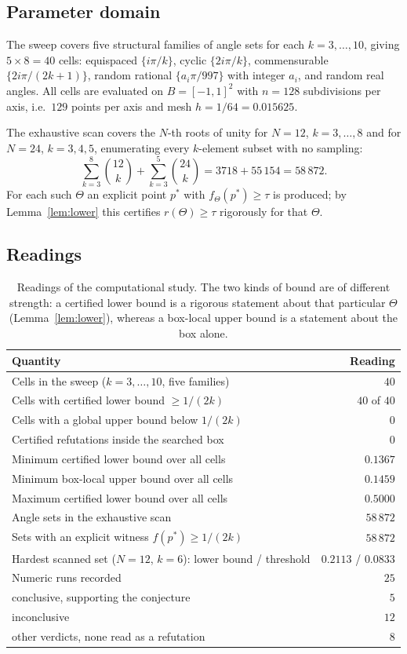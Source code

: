 \documentclass[11pt]{article}
\theoremstyle{plain}
\theoremstyle{definition}
\theoremstyle{remark}
\begin{document}
\subsection{Parameter domain}

The sweep covers five structural families of angle sets for each $k=3,\dots,10$, giving $5\times8=40$
cells: equispaced $\{i\pi/k\}$, cyclic $\{2i\pi/k\}$, commensurable $\{2i\pi/(2k+1)\}$, random rational
$\{a_i\pi/997\}$ with integer $a_i$, and random real angles. All cells are evaluated on $B=[-1,1]^2$
with $n=128$ subdivisions per axis, i.e.\ $129$ points per axis and mesh $h=1/64=0.015625$.

The exhaustive scan covers the $N$-th roots of unity for $N=12$, $k=3,\dots,8$ and for $N=24$,
$k=3,4,5$, enumerating every $k$-element subset with no sampling:
\[
\sum_{k=3}^{8}\binom{12}{k}+\sum_{k=3}^{5}\binom{24}{k}=3718+55\,154=58\,872 .
\]
For each such $\Theta$ an explicit point $p^{*}$ with $f_\Theta(p^{*})\ge\tau$ is produced; by
Lemma~\ref{lem:lower} this certifies $r(\Theta)\ge\tau$ rigorously for that $\Theta$.

\subsection{Readings}

\begin{table}[htbp]
\centering
\caption{Readings of the computational study. The two kinds of bound are of different strength: a
certified lower bound is a rigorous statement about that particular $\Theta$
(Lemma~\ref{lem:lower}), whereas a box-local upper bound is a statement about the box alone.}
\label{tab:readings}
\begin{tabular}{lr}
\toprule
Quantity & Reading \\
\midrule
Cells in the sweep ($k=3,\dots,10$, five families) & $40$ \\
Cells with certified lower bound $\ge1/(2k)$ & $40$ of $40$ \\
Cells with a global upper bound below $1/(2k)$ & $0$ \\
Certified refutations inside the searched box & $0$ \\
Minimum certified lower bound over all cells & $0.1367$ \\
Minimum box-local upper bound over all cells & $0.1459$ \\
Maximum certified lower bound over all cells & $0.5000$ \\
Angle sets in the exhaustive scan & $58\,872$ \\
Sets with an explicit witness $f(p^{*})\ge1/(2k)$ & $58\,872$ \\
Hardest scanned set ($N=12$, $k=6$): lower bound / threshold & $0.2113$ / $0.0833$ \\
\midrule
Numeric runs recorded & $25$ \\
\quad conclusive, supporting the conjecture & $5$ \\
\quad inconclusive & $12$ \\
\quad other verdicts, none read as a refutation & $8$ \\
\bottomrule
\end{tabular}
\end{table}
\end{document}
